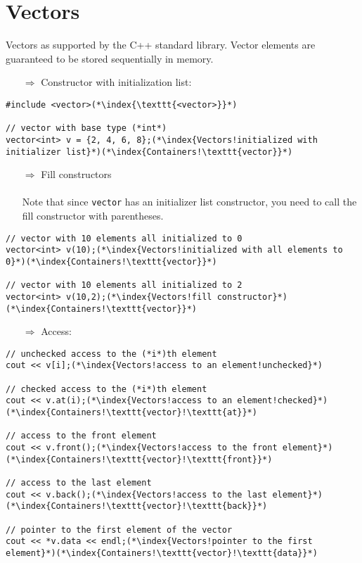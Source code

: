 \documentclass[10pt]{article}
\begin{document}
\section{Vectors}
\small
Vectors as supported by the C++ standard library. Vector elements are guaranteed to be stored sequentially in memory.
\begin{enumerate}
\item[$\Rightarrow$] Constructor with initialization list:
\end{enumerate}
\begin{lstlisting}
#include <vector>(*\index{\texttt{<vector>}}*)

// vector with base type (*int*)
vector<int> v = {2, 4, 6, 8};(*\index{Vectors!initialized with initializer list}*)(*\index{Containers!\texttt{vector}}*)
\end{lstlisting}
\begin{enumerate}
\item[$\Rightarrow$] Fill constructors\\ \\ Note that since \texttt{vector} has an initializer list constructor, you need to call the fill constructor with parentheses.
\end{enumerate}
\begin{lstlisting}
// vector with 10 elements all initialized to 0
vector<int> v(10);(*\index{Vectors!initialized with all elements to 0}*)(*\index{Containers!\texttt{vector}}*)

// vector with 10 elements all initialized to 2
vector<int> v(10,2);(*\index{Vectors!fill constructor}*)(*\index{Containers!\texttt{vector}}*)
\end{lstlisting}
\begin{enumerate}
\item[$\Rightarrow$] Access:
\end{enumerate}
\begin{lstlisting}
// unchecked access to the (*i*)th element
cout << v[i];(*\index{Vectors!access to an element!unchecked}*)

// checked access to the (*i*)th element
cout << v.at(i);(*\index{Vectors!access to an element!checked}*)(*\index{Containers!\texttt{vector}!\texttt{at}}*)

// access to the front element
cout << v.front();(*\index{Vectors!access to the front element}*)(*\index{Containers!\texttt{vector}!\texttt{front}}*)

// access to the last element
cout << v.back();(*\index{Vectors!access to the last element}*)(*\index{Containers!\texttt{vector}!\texttt{back}}*)

// pointer to the first element of the vector
cout << *v.data << endl;(*\index{Vectors!pointer to the first element}*)(*\index{Containers!\texttt{vector}!\texttt{data}}*)
\end{lstlisting}
\end{document}
